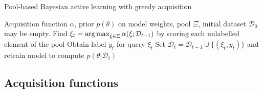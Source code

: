 \documentclass[a4paper, 10pt]{report}
\theoremstyle{plain}
\begin{document}
	\begin{algorithm}[t]
		\caption{Pool-based Bayesian active learning with greedy acquisition}\label{alg:pool}
		\begin{algorithmic}
			\Require Acquisition function $\alpha$,  prior $p(\theta)$ on model weights, pool $\Xi$, initial dataset $\mathcal{D}_0$ may be empty.
			\State Find $\xi_t = \operatorname*{arg\,max}_{\xi\in\Xi} \alpha(\xi ; \mathcal{D}_{t-1})$ by scoring each unlabelled element of the pool
			\State Obtain label $y_t$ for query $\xi_t$
			\State Set $\mathcal{D}_{t} = \mathcal{D}_{t-1} \cup \{(\xi_t,y_t)\}$ and retrain model to compute $p(\theta|\mathcal{D}_t)$
			\EndFor
		\end{algorithmic}
	\end{algorithm}
	
	\subsection{Acquisition functions}
	
\end{document}
